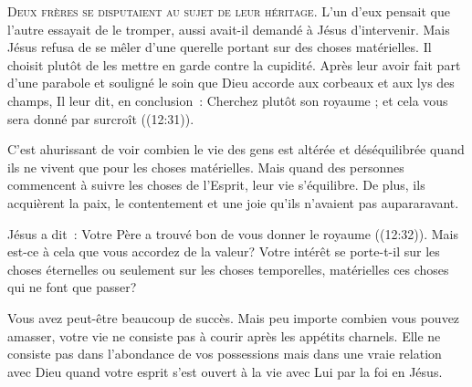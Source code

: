 

\lettrine{D}{eux frères se disputaient au sujet de leur héritage.}
 L'un d'eux pensait que l'autre essayait de le tromper,
 aussi avait-il demandé à Jésus d'intervenir.
 Mais Jésus refusa de se mêler d'une querelle portant
 sur des choses matérielles. Il choisit plutôt de les mettre en garde
 contre la cupidité. Après leur avoir fait part d'une parabole
 et souligné le soin que Dieu accorde aux corbeaux et aux lys des champs,
 Il leur dit, en conclusion~: 
 \og Cherchez plutôt son royaume ; et cela vous sera donné par surcroît \fg{}
 ((12:31)). 


C'est ahurissant de voir combien le vie des gens est altérée
 et déséquilibrée quand ils ne vivent que pour les choses matérielles.
 Mais quand des personnes commencent à suivre les choses de l'Esprit,
 leur vie s'équilibre. De plus, ils acquièrent la paix,
 le contentement et une joie qu'ils n'avaient pas aupararavant.

Jésus a dit~: 
 \og Votre Père a trouvé bon de vous donner le royaume \fg{}
 ((12:32)). Mais est-ce à cela que vous accordez
 de la valeur? Votre intérêt se porte-t-il sur les choses éternelles
 ou seulement sur les choses temporelles, matérielles
 \ocadr ces choses qui ne font que passer?

Vous avez peut-être beaucoup de succès. Mais peu importe combien
 vous pouvez amasser, votre vie ne consiste pas à courir après
 les appétits charnels. Elle ne consiste pas dans l'abondance
 de vos possessions mais dans une vraie relation avec Dieu
 quand votre esprit s'est ouvert à la vie avec Lui par la foi en Jésus.

\dvrule





